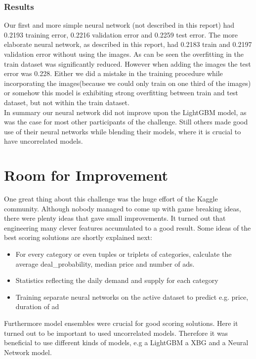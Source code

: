 \documentclass[runningheads]{llncs}
\begin{document}
 \subsubsection{Results}
 Our first and more simple neural network (not described in this report) had 0.2193 training error, 0.2216 validation error and 0.2259 test error. The more elaborate neural network, as described in this report, had 0.2183 train and 0.2197 validation error without using the images. As can be seen the overfitting in the train dataset was significantly reduced. However when adding the images the test error was 0.228. Either we did a mistake in the training procedure while incorporating the images(because we could only train on one third of the images) or somehow this model is exhibiting strong overfitting between train and test dataset, but not within the train dataset.\\
 In summary our neural network did not improve upon the LightGBM model, as was the case for most other participants of the challenge. Still others made good use of their neural networks while  blending their models, where it is crucial
  to have uncorrelated models.\\
 
 \section{Room for Improvement}
 One great thing about this challenge was the huge effort of the Kaggle community. Although nobody managed to come up with game breaking ideas, there were plenty ideas that gave small improvements. It turned out that engineering many clever features accumulated to a good result. Some ideas of the best scoring solutions are shortly explained next:\\
 \begin{itemize}
 	\item For every category or even tuples or triplets of categories, calculate the average deal\_probability, median price and number of ads.
 	\item Statistics reflecting the daily demand and supply for each category
 	\item Training separate neural networks on the active dataset to predict e.g. price, duration of ad
 \end{itemize}

Furthermore model ensembles were crucial for good scoring solutions. Here it turned out to be important to used uncorrelated models. Therefore it was beneficial to use different kinds of models, e.g a LightGBM a XBG and a Neural Network model. \\
\end{document}
